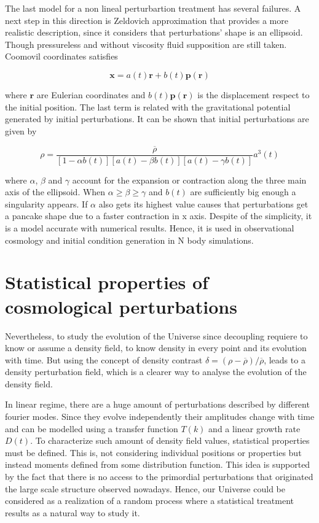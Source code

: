 The last model for a non lineal perturbartion treatment 
has several failures. A next step in this direction is 
Zeldovich approximation that provides a more realistic description, 
since it considers that perturbations' shape is an ellipsoid.
Though pressureless and without viscosity fluid supposition are still taken.
Coomovil coordinates satisfies 

\[
\textbf{x} = a(t)\textbf{r}+b(t)\textbf{p}(\textbf{r})
\]

where $\textbf{r}$ are Eulerian coordinates and $b(t)\textbf{p}(\textbf{r})$
is the displacement respect to the initial position. The last term is related 
with the gravitational potential generated by initial perturbations. 
It can be shown that initial perturbations are given by 

\[
\rho = \frac{\overline{\rho} }{[1-\alpha b(t)][a(t)-\beta b(t)][a(t)-\gamma b(t)]}a^3(t)
\]

where $\alpha$, $\beta$ and $\gamma$ account for the expansion or contraction 
along the three main axis of the ellipsoid. 
When  $\alpha \geq \beta \geq \gamma$ and $b(t)$ are sufficiently big enough a 
singularity appears. If $\alpha$ also gets its highest value causes that perturbations
get a pancake shape due to a faster contraction in x axis. 
Despite of the simplicity, it is a model accurate with numerical results. Hence,
it is used in observational cosmology and initial condition generation in N body
simulations. 

\section{ Statistical properties of cosmological perturbations }

Nevertheless, to study the evolution of the Universe since decoupling requiere to know 
or assume a density field, to know density in every point and its evolution with time. 
But using the concept of density contrast $\delta = (\rho - \overline{\rho})/\overline{\rho}$, 
leads to a density perturbation field, which is a clearer way to analyse the evolution
of the density field.

In linear regime, there are a huge amount of perturbations described by different 
fourier modes. Since they evolve independently their amplitudes change with time and 
can be modelled using a transfer function $T(k)$ and a linear growth rate $D(t)$. 
To characterize such amount of density field values, statistical 
properties must be defined. 
This is, not considering individual positions or properties but instead moments defined from
some distribution function. This idea is supported by the fact that there is no access 
to the primordial perturbations that originated the large scale structure observed 
nowadays. Hence, our Universe could be considered as a realization of a random process 
where a statistical treatment results as a natural way to study it. 

